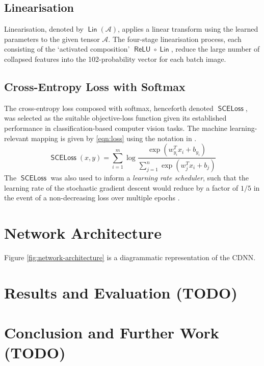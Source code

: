 \documentclass[journal]{IEEEtran}
\DeclareMathOperator\relu{\mathsf{ReLU}}
\DeclareMathOperator\linear{\mathsf{Lin}}
\DeclareMathOperator\loss{\mathsf{SCELoss}}
\begin{document}
\subsection{Linearisation}
Linearisation, denoted by $\linear(\mathcal{A})$, applies a linear transform
using the learned parameters to the given tensor $\mathcal{A}$. The four-stage
linearisation process, each consisting of the `activated composition' $\relu
\circ \linear$, reduce the large number of collapsed features into the
102-probability vector for each batch image.

\subsection{Cross-Entropy Loss with Softmax}
The cross-entropy loss composed with softmax, henceforth denoted $\loss$, was
selected as the suitable objective-loss function given its established
performance in classification-based computer vision tasks. The machine
learning-relevant mapping is given by \eqref{eqn:loss} using the notation in
\cite{Jie:2018}.
\begin{equation}
    \loss(x, y) = \sum_{i=1}^m \log\frac%
        {\exp\left(w^T_{y_i} x_i + b_{y_i}\right)}%
        {\sum_{j=1}^n \exp\left(w^T_j x_i + b_j\right)}%
    \label{eqn:loss}
\end{equation}
The $\loss$ was also used to inform a \emph{learning rate scheduler}, such that
the learning rate of the stochastic gradient descent would reduce by a factor of
$1/5$ in the event of a non-decreasing loss over multiple epochs
\cite{Konar:2020}.

\section{Network Architecture}
Figure \ref{fig:network-architecture} is a diagrammatic representation of the
CDNN.

\section{Results and Evaluation (TODO)}
\section{Conclusion and Further Work (TODO)}

\clearpage %


\end{document}
